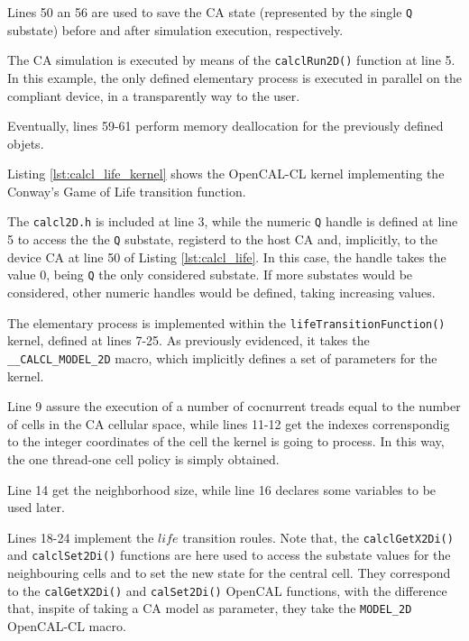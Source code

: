 Lines 50 an 56 are used to save the CA state (represented by the
single \verb'Q' substate) before and after simulation execution,
respectively.

The CA simulation is executed by means of the \verb'calclRun2D()'
function at line 5. In this example, the only defined elementary
process is executed in parallel on the compliant device, in a
transparently way to the user.

Eventually, lines 59-61 perform memory deallocation for the previously
defined objets.



Listing \ref{lst:calcl_life_kernel} shows the OpenCAL-CL kernel
implementing the Conway's Game of Life transition function.

The \verb'calcl2D.h' is included at line 3, while the numeric \verb'Q'
handle is defined at line 5 to access the the \verb'Q' substate,
registerd to the host CA and, implicitly, to the device CA at line 50
of Listing \ref{lst:calcl_life}. In this case, the handle takes the
value 0, being \verb'Q' the only considered substate. If more
substates would be considered, other numeric handles would be defined,
taking increasing values.

The elementary process is implemented within the
\verb'lifeTransitionFunction()' kernel, defined at lines 7-25. As
previously evidenced, it takes the \verb'__CALCL_MODEL_2D' macro,
which implicitly defines a set of parameters for the kernel.

Line 9 assure the execution of a number of cocnurrent treads equal to
the number of cells in the CA cellular space, while lines 11-12 get the
indexes correnspondig to the integer coordinates of the cell the
kernel is going to process. In this way, the one thread-one cell
policy is simply obtained.

Line 14 get the neighborhood size, while line 16 declares some
variables to be used later.

Lines 18-24 implement the $life$ transition roules. Note that, the
\verb'calclGetX2Di()' and \verb'calclSet2Di()' functions are here used
to access the substate values for the neighbouring cells and to set
the new state for the central cell. They correspond to the
\verb'calGetX2Di()' and \verb'calSet2Di()' OpenCAL functions, with the
difference that, inspite of taking a CA model as parameter, they take
the \verb'MODEL_2D' OpenCAL-CL macro.

